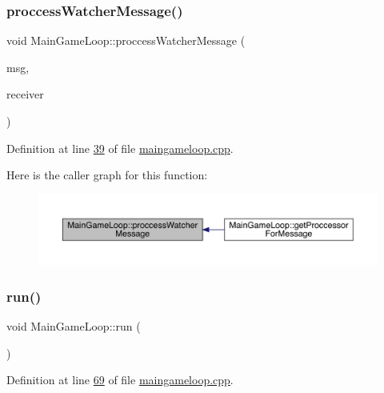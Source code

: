 \subsubsection{\texorpdfstring{proccess\+Watcher\+Message()}{proccessWatcherMessage()}}
{\footnotesize\ttfamily void Main\+Game\+Loop\+::proccess\+Watcher\+Message (\begin{DoxyParamCaption}\item[{\hyperlink{a00201}{Mail\+Receiver\+::mail\+Message} $\ast$}]{msg,  }\item[{\hyperlink{a00205}{Mail\+Sender} $\ast$}]{receiver }\end{DoxyParamCaption})\hspace{0.3cm}{\ttfamily [private]}}



Definition at line \hyperlink{a00089_source_l00039}{39} of file \hyperlink{a00089_source}{maingameloop.\+cpp}.

Here is the caller graph for this function\+:
\nopagebreak
\begin{figure}[H]
\begin{center}
\leavevmode
\includegraphics[width=350pt]{d3/de5/a00209_a26ac1e61f11a51a84b6f2e770808d162_icgraph}
\end{center}
\end{figure}
\mbox{\label{a00209_a5a20009c07c887a9cf69381f62da5009}} 
\subsubsection{\texorpdfstring{run()}{run()}}
{\footnotesize\ttfamily void Main\+Game\+Loop\+::run (\begin{DoxyParamCaption}{ }\end{DoxyParamCaption})\hspace{0.3cm}{\ttfamily [protected]}}



Definition at line \hyperlink{a00089_source_l00069}{69} of file \hyperlink{a00089_source}{maingameloop.\+cpp}.

\mbox{\label{a00197_a0efada2a49e9a841430a8b6f71b6803d}} 
